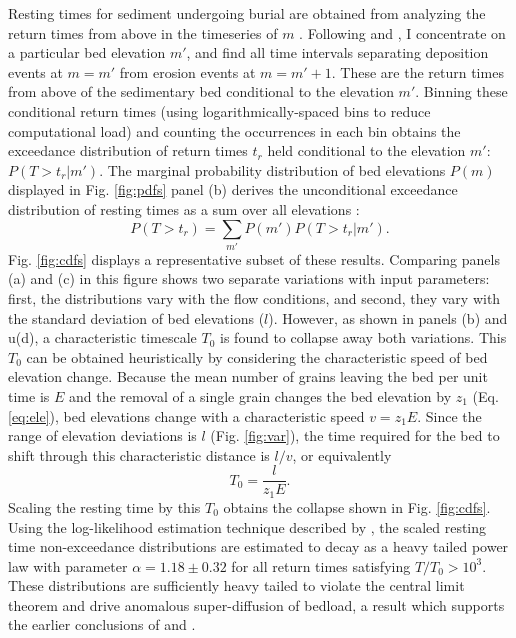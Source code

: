 Resting times for sediment undergoing burial are obtained from analyzing the return times from above in the timeseries of $m$ \citep[e.g.][]{Redner2007}.
Following \citet{Voepel2013} and \citet{Martin2014}, I concentrate on a particular bed elevation $m'$, and find all time intervals separating deposition events at $m=m'$ from erosion events at $m=m'+1$.
These are the return times from above of the sedimentary bed conditional to the elevation $m'$.
Binning these conditional return times (using logarithmically-spaced bins to reduce computational load) and counting the occurrences in each bin obtains the exceedance distribution of return times $t_r$ held conditional to the elevation $m'$: $P(T>t_r|m')$.
The marginal probability distribution of bed elevations $P(m)$ displayed in Fig. \ref{fig:pdfs} panel (b) derives the unconditional exceedance distribution of resting times as a sum over all elevations \citep{Yang1971, Nakagawa1980, Voepel2013, Martin2014}: 
\begin{equation} P(T>t_r) = \sum_{m'} P(m') P(T>t_r|m') .\end{equation}
Fig. \ref{fig:cdfs} displays a representative subset of these results.
Comparing panels (a) and (c) in this figure shows two separate variations with input parameters: first, the distributions vary with the flow conditions, and second, they vary with the standard deviation of bed elevations ($l$).
However, as shown in panels (b) and u(d), a characteristic timescale $T_0$ is found to collapse away both variations.
This $T_0$ can be obtained heuristically by considering the characteristic speed of bed elevation change.
Because the mean number of grains leaving the bed per unit time is $E$ and the removal of a single grain changes the bed elevation by $z_1$ (Eq. \ref{eq:ele}), bed elevations change with a characteristic speed $v = z_1 E$.
Since the range of elevation deviations is $l$ (Fig. \ref{fig:var}), the time required for the bed to shift through this characteristic distance is $l/v$, or equivalently
\begin{equation} T_0 = \frac{l}{z_1 E}.\label{eq:time}\end{equation}
Scaling the resting time by this $T_0$ obtains the collapse shown in Fig. \ref{fig:cdfs}.
Using the log-likelihood estimation technique described by \citet{Newman2005}, the scaled resting time non-exceedance distributions are estimated to decay as a heavy tailed power law with parameter $\alpha = 1.18 \pm 0.32$ for all return times satisfying $T/T_0 > 10^3$.
These distributions are sufficiently heavy tailed to violate the central limit theorem and drive anomalous super-diffusion of bedload, a result which supports the earlier conclusions of \citet{Voepel2013} and \citet{Martin2014}.

